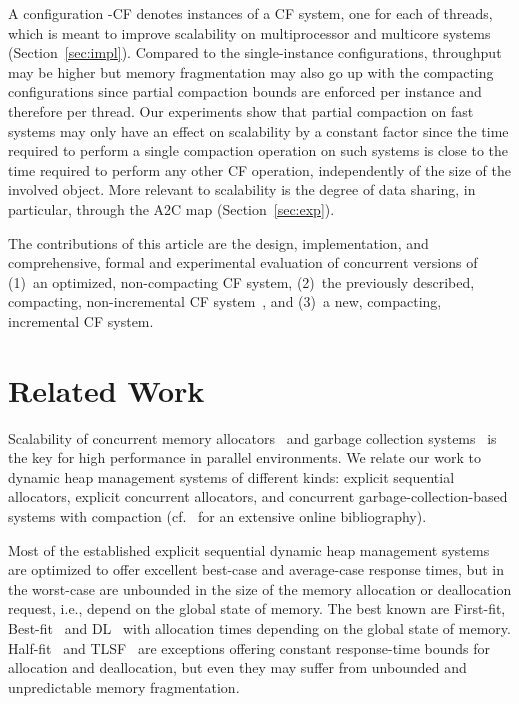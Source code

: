 \documentclass{amsart}
\begin{document}
A configuration -CF denotes  instances of a CF
system, one for each of  threads, which is meant to improve
scalability on multiprocessor and multicore systems
(Section~\ref{sec:impl}).  Compared to the single-instance
configurations, throughput may be higher but memory fragmentation may
also go up with the compacting configurations since partial compaction
bounds are enforced per instance and therefore per thread.  Our
experiments show that partial compaction on fast systems may only have
an effect on scalability by a constant factor since the time required
to perform a single compaction operation on such systems is close to
the time required to perform any other CF operation, independently of
the size of the involved object.  More relevant to scalability is the
degree of data sharing, in particular, through the A2C map
(Section~\ref{sec:exp}).

The contributions of this article are the design, implementation, and
comprehensive, formal and experimental evaluation of concurrent
versions of (1)~an optimized, non-compacting CF system, (2)~the
previously described, compacting, non-incremental CF
system~\cite{USENIX08}, and (3)~a new, compacting, incremental CF
system.

\section{Related Work}
\label{sec:rel}







Scalability of concurrent memory allocators~\cite{Ber1} and garbage collection
systems~\cite{Gidra11,Payer12a} is {the} key for high performance in parallel
environments.  We relate our work to dynamic heap management systems of
different kinds: explicit sequential allocators, explicit concurrent
allocators, and concurrent garbage-collection-based systems with compaction
(cf.~\cite{Jon1} for an extensive online bibliography).

Most of the established explicit sequential dynamic heap management
systems~\cite{Mas2,Pua1} are optimized to offer excellent best-case
and average-case response times, but in the worst-case are unbounded
in the size of the memory allocation or deallocation request, i.e.,
depend on the global state of memory.  The best known are First-fit,
Best-fit~\cite{Knu1} and DL~\cite{Dou1} with allocation times
depending on the global state of memory.  Half-fit~\cite{Oga1} and
TLSF~\cite{Mas1} are exceptions offering constant response-time bounds
for allocation and deallocation, but even they may suffer from
unbounded and unpredictable memory fragmentation.
\end{document}
